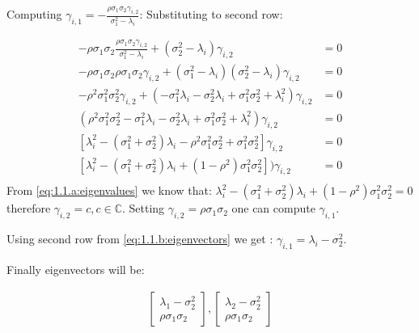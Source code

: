 \begin{solution}
\hfill\break
Computing $\gamma_{i,1} =- \frac{\rho\sigma_{1}\sigma_{2} \gamma_{i,2}}{ \sigma_{1}^2  -\lambda_i }$:
Substituting to second row:

\begin{equation}
\begin{aligned}
-\rho\sigma_{1}\sigma_{2} \frac{\rho\sigma_{1}\sigma_{2} \gamma_{i,2}}{ \sigma_{1}^2  -\lambda_i } 
	+( \sigma_{2}^2   -\lambda_i)\gamma_{i,2} & = 0 \\
-\rho\sigma_{1}\sigma_{2} \rho\sigma_{1}\sigma_{2} \gamma_{i,2}
	+ ( \sigma_{1}^2   -\lambda_i) ( \sigma_{2}^2   -\lambda_i)\gamma_{i,2} & = 0	\\
-\rho^2\sigma_{1}^2\sigma_{2}^2 \gamma_{i,2}
	+ (- \sigma_{1}^2 \lambda_i - \sigma_{2}^2 \lambda_i + \sigma_{1}^2 \sigma_{2}^2  +\lambda_i^2)\gamma_{i,2} & = 0  \\
(\rho^2\sigma_{1}^2\sigma_{2}^2 
	- \sigma_{1}^2 \lambda_i - \sigma_{2}^2 \lambda_i + \sigma_{1}^2 \sigma_{2}^2  +\lambda_i^2)\gamma_{i,2} & = 0 \\
\left[\lambda_i^2 -(\sigma_{1}^2 + \sigma_{2}^2 )\lambda_i  -\rho^2\sigma_{1}^2\sigma_{2}^2 
	+ \sigma_{1}^2 \sigma_{2}^2  \right]\gamma_{i,2} & = 0 \\
\left[\lambda_i^2 -(\sigma_{1}^2 + \sigma_{2}^2 )\lambda_i  + (1-\rho^2)\sigma_{1}^2 \sigma_{2}^2 \right])\gamma_{i,2} & = 0 \\
\end{aligned}
\end{equation}
\hfill\break
From \autoref{eq:1.1.a:eigenvalues} we know that: $\lambda_i^2 -(\sigma_{1}^2 + \sigma_{2}^2 )\lambda_i  + (1-\rho^2)\sigma_{1}^2 \sigma_{2}^2  = 0$ therefore $\gamma_{i,2} = c, c \in \mathbb{C}$. Setting $\gamma_{i,2} = \rho\sigma_{1}\sigma_{2} $  one can compute $\gamma_{i,1} $. 

Using second row from \autoref{eq:1.1.b:eigenvectors} we get : $\gamma_{i,1} =\lambda_i - \sigma_{2}^2 $. 

Finally eigenvectors will be:

\begin{equation}
\begin{aligned}
\left[\begin{array}{c} \lambda_1 - \sigma_{2}^2 \\ \rho\sigma_{1}\sigma_{2} \end{array}\right] ,
\left[\begin{array}{c} \lambda_2 - \sigma_{2}^2 \\ \rho\sigma_{1}\sigma_{2} \end{array}\right] 
\end{aligned}
\end{equation}

\hfill\break


           
\end{solution}